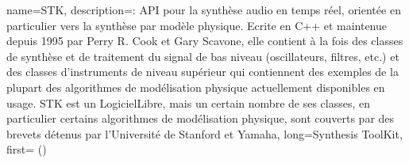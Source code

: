 {
    name={STK},
    description={\textit{}: \gls{API} pour la synthèse audio en temps réel, orientée en particulier vers la synthèse par modèle physique. Ecrite en C++ et maintenue depuis 1995 par Perry R. Cook et Gary Scavone, elle contient à la fois des classes de synthèse et de traitement du signal de bas niveau (oscillateurs, filtres, etc.) et des classes d'instruments de niveau supérieur qui contiennent des exemples de la plupart des algorithmes de modélisation physique actuellement disponibles en usage. STK est un \gls{LogicielLibre}, mais un certain nombre de ses classes, en particulier certains algorithmes de modélisation physique, sont couverts par des brevets détenus par l'Université de Stanford et Yamaha},
    long={Synthesis ToolKit},
    first={ ()}
}

